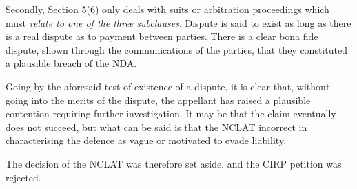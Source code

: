 \documentclass[12pt]{article}
\begin{document}
Secondly, Section 5(6) only deals with suits or arbitration proceedings which must \textit{relate to one of the three subclauses}. Dispute is said to exist as long as there is a real dispute as to payment between parties. There is a clear bona fide dispute, shown through the communications of the parties, that they constituted a plausible breach of the NDA.

Going by the aforesaid test of existence of a dispute, it is clear that, without going into the merits of the dispute, the appellant has raised a plausible contention requiring further investigation. It may be that the claim eventually does not succeed, but what can be said is that the NCLAT incorrect in characterising the defence as vague or motivated to evade liability.


The decision of the NCLAT was therefore set aside, and the CIRP petition was rejected. 
\end{document}
